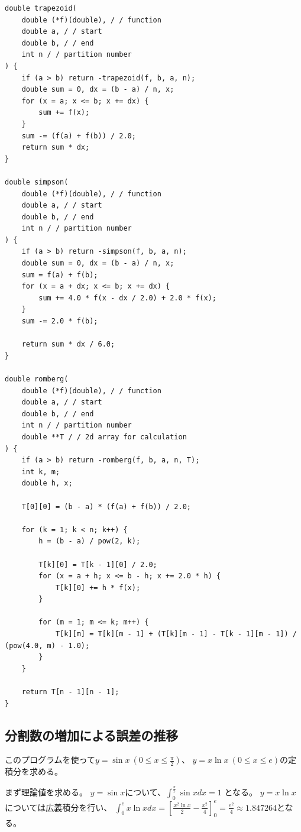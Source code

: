 \documentclass{jsarticle}
\begin{document}
        \begin{lstlisting}[caption=integral.c, label=src:int]
double trapezoid(
    double (*f)(double), / / function
    double a, / / start
    double b, / / end
    int n / / partition number
) {
    if (a > b) return -trapezoid(f, b, a, n);
    double sum = 0, dx = (b - a) / n, x;
    for (x = a; x <= b; x += dx) {
        sum += f(x);
    }
    sum -= (f(a) + f(b)) / 2.0;
    return sum * dx;
}

double simpson(
    double (*f)(double), / / function
    double a, / / start
    double b, / / end
    int n / / partition number
) {
    if (a > b) return -simpson(f, b, a, n);
    double sum = 0, dx = (b - a) / n, x;
    sum = f(a) + f(b);
    for (x = a + dx; x <= b; x += dx) {
        sum += 4.0 * f(x - dx / 2.0) + 2.0 * f(x);
    }
    sum -= 2.0 * f(b);
    
    return sum * dx / 6.0;
}

double romberg(
    double (*f)(double), / / function
    double a, / / start
    double b, / / end
    int n / / partition number
    double **T / / 2d array for calculation
) {
    if (a > b) return -romberg(f, b, a, n, T);
    int k, m;
    double h, x;

    T[0][0] = (b - a) * (f(a) + f(b)) / 2.0;

    for (k = 1; k < n; k++) {
        h = (b - a) / pow(2, k);

        T[k][0] = T[k - 1][0] / 2.0;
        for (x = a + h; x <= b - h; x += 2.0 * h) {
            T[k][0] += h * f(x);
        }

        for (m = 1; m <= k; m++) {
            T[k][m] = T[k][m - 1] + (T[k][m - 1] - T[k - 1][m - 1]) / (pow(4.0, m) - 1.0);
        }
    }

    return T[n - 1][n - 1];
}\end{lstlisting}

    \subsection{分割数の増加による誤差の推移}
        このプログラムを使って$y = \sin x \ (0 \le x \le \displaystyle\frac{\pi}{2})$、
        $y = x \ln x \ (0 \le x \le e)$の定積分を求める。

        まず理論値を求める。
        $y = \sin x$について、$\displaystyle\int_0^{\frac{\pi}{2}} \sin x dx = 1$
        となる。
        $y = x\ln x$については広義積分を行い、
        $\displaystyle\int_0^e x \ln x dx = \left[\frac{x^2\ln x}{2} - \frac{x^2}{4}\right]_0^e = \frac{e^2}{4} \approx 1.847264$となる。
\end{document}
